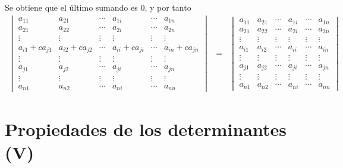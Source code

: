 \documentclass[
]{article}
\begin{document}
Se obtiene que el último sumando es 0, y por tanto \begin{equation}
\begin{array}{ccc}
  \begin{vmatrix}
     a_{11}        & a_{21}   & \cdots     & a_{1i}       & \cdots     & a_{1n}      \\ 
     a_{21}        & a_{22}   & \cdots     & a_{2i}       & \cdots     & a_{2n}      \\
     \vdots        & \vdots   & \vdots     &  \vdots      & \vdots     & \vdots \\  
     a_{i1}+ca_{j1}&a_{i2}+ca_{j2}&\cdots&a_{ii}+ca_{ji} & \cdots     & a_{in}+ca_{jn}\\
     \vdots        & \vdots   & \vdots     &  \vdots      & \vdots     & \vdots \\  
     a_{j1}        & a_{j2}   & \cdots     & a_{ji}       & \cdots     & a_{jn}      \\
      \vdots       & \vdots   & \vdots     &  \vdots      & \vdots     & \vdots \\
      a_{n1}        & a_{n2}   & \cdots     & a_{ni}       & \cdots     & a_{nn} 
  \end{vmatrix} & = &
  \begin{vmatrix}
     a_{11}        & a_{21}   & \cdots     & a_{1i}       & \cdots     & a_{1n}      \\ 
     a_{21}        & a_{22}   & \cdots     & a_{2i}       & \cdots     & a_{2n}      \\
     \vdots        & \vdots   & \vdots     &  \vdots      & \vdots     & \vdots      \\  
     a_{i1}        &a_{i2}    &\cdots      &a_{ii}        & \cdots     & a_{in}      \\
     \vdots        & \vdots   & \vdots     &  \vdots      & \vdots     & \vdots      \\  
     a_{j1}        & a_{j2}   & \cdots     & a_{ji}       & \cdots     & a_{jn}      \\
      \vdots       & \vdots   & \vdots     &  \vdots      & \vdots     & \vdots      \\
      a_{n1}        & a_{n2}   & \cdots     & a_{ni}       & \cdots     & a_{nn} 
  \end{vmatrix}
\end{array}
\end{equation}

\hypertarget{propiedades-de-los-determinantes-v}{%
\section{Propiedades de los determinantes
(V)}\label{propiedades-de-los-determinantes-v}}
\end{document}

